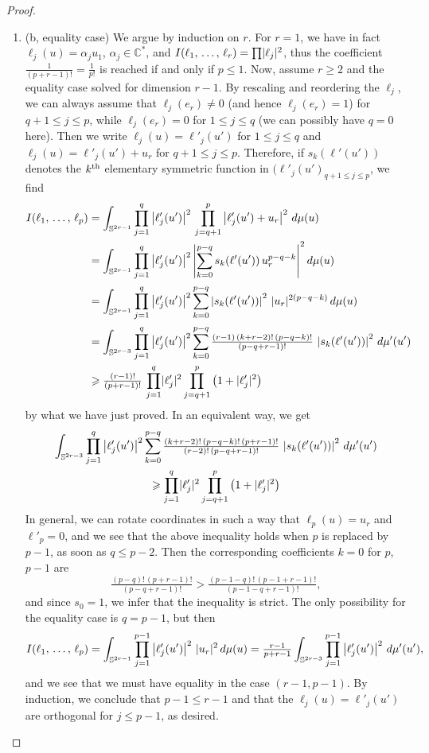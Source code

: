 \documentclass[10pt,a4paper]{article}
\DeclarePairedDelimiter{\abs}{\lvert}{\rvert}
\newcommand*\bC{\mathbb{C}}
\newcommand*\bS{\mathbb{S}}
\let\leq\leqslant
\let\geq\geqslant
\numberwithin{equation}{section}
\begin{document}
\begin{proof}
\begin{enumerate}
\item (b, equality case) We argue by induction on $r$. For $r=1$, we have in fact $\ell_j(u)=\alpha_ju_1$, $\alpha_j\in\bC^*$, and
$I(\ell_1,\,\dotsc,\,\ell_r)=\prod\abs{\ell_j}^2$, thus the coefficient $\tfrac{1}{ (p+r-1)!}=\tfrac{1}{ p!}$ is reached if and only if $p\leq 1$. Now, assume $r\geq 2$ and the equality case solved for dimension $r-1$. By rescaling and reordering the $\ell_j$, we can always assume that $\ell_j(e_r)\ne 0$ (and hence
$\ell_j(e_r)=1$) for $q+1\leq j\leq p$, while $\ell_j(e_r)=0$ for
$1\leq j\leq q$ (we can possibly have $q=0$ here). Then we write
$\ell_j(u)=\ell'_j(u')$ for $1\leq j\leq q$ and
$\ell_j(u)=\ell'_j(u')+u_r$ for $q+1\leq j\leq p$. Therefore, if
$s_k(\ell'(u'))$ denotes the $k^{\rm th}$ elementary symmetric function in
$(\ell'_j(u')_{q+1\leq j\leq p}$, we find
\begin{align*}
I(\ell_1,\,\dotsc,\,\ell_p) &=\int_{\bS^{2r-1}}\prod_{j=1}^q\left|\ell'_j(u')\right|^2\,
\prod_{j=q+1}^p\left|\ell'_j(u')+u_r\right|^2\,d\mu(u)\\
&=\int_{\bS^{2r-1}}\prod_{j=1}^q\left|\ell'_j(u')\right|^2
\left|\sum_{k=0}^{p-q}s_k(\ell'(u'))\,u_r^{p-q-k}\right|^2 d\mu(u)
\\
&=\int_{\bS^{2r-1}}\prod_{j=1}^q\left|\ell'_j(u')\right|^2
\sum_{k=0}^{p-q}
\left|s_k(\ell'(u'))\right|^2\,\abs{u_r}^{2(p-q-k)}\,d\mu(u)\\
&=\int_{\bS^{2r-3}}\prod_{j=1}^q\left|\ell'_j(u')\right|^2
\sum_{k=0}^{p-q}\tfrac{(r-1)\,(k+r-2)!\,(p-q-k)!}{(p-q+r-1)!}\,
\left|s_k(\ell'(u'))\right|^2\,d\mu'(u')\\
&\geq\tfrac{(r-1)!}{(p+r-1)!}\,\prod_{j=1}^q\abs{\ell'_j}^2
\prod_{j=q+1}^p\left(1+\abs{\ell'_j}^2\right)
\end{align*}
by what we have just proved. In an equivalent way, we get
\begin{multline*}
\int_{\bS^{2r-3}}\prod_{j=1}^q\left|\ell'_j(u')\right|^2
\sum_{k=0}^{p-q}\tfrac{(k+r-2)!\,(p-q-k)!\,(p+r-1)!}{(r-2)!\,(p-q+r-1)!}\,
\left|s_k(\ell'(u'))\right|^2\,d\mu'(u')
\\
\geq\prod_{j=1}^q\abs{\ell'_j}^2
\prod_{j=q+1}^p\left(1+\abs{\ell'_j}^2\right)
\end{multline*}
In general, we can rotate coordinates in such a way that $\ell_p(u)=u_r$ and $\ell'_p=0$, and we see that the above inequality holds when $p$ is replaced by $p-1$, as soon as $q\leq p-2$. Then the corresponding coefficients $k=0$ for $p$, $p-1$ are
\[
\tfrac{(p-q)!\,(p+r-1)!}{(p-q+r-1)!}>\tfrac{(p-1-q)!\,(p-1+r-1)!}{(p-1-q+r-1)!},
\]
and since $s_0=1$, we infer that the inequality is strict. The only possibility for the equality case is $q=p-1$, but then
\[
I(\ell_1,\,\dotsc,\,\ell_p)=
\int_{\bS^{2r-1}}\prod_{j=1}^{p-1}\left|\ell'_j(u')\right|^2\,\abs{u_r}^2\,d\mu(u)=
\tfrac{r-1}{ p+r-1}\int_{\bS^{2r-3}}\prod_{j=1}^{p-1}\left|\ell'_j(u')\right|^2\,d\mu'(u'),
\]
and we see that we must have equality in the case $(r-1,p-1)$. By induction, we conclude that $p-1\leq r-1$ and that the
$\ell_j(u)=\ell'_j(u')$ are orthogonal for $j\leq p-1$, as desired.\qedhere
\end{enumerate}
\end{proof}
\end{document}
